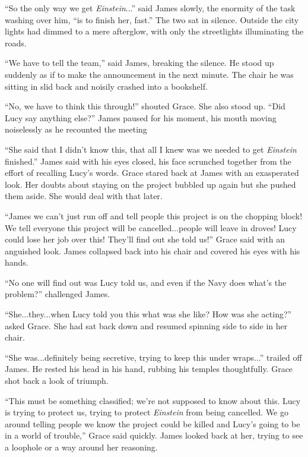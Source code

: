 \documentclass[openany, 12pt]{book} %
\begin{document}
``So the only way we get \textit{Einstein}...'' said James slowly, the enormity of the task washing over him, ``is to finish her, fast.'' The two sat in silence. Outside the city lights had dimmed to a mere afterglow, with only the streetlights illuminating the roads.

``We have to tell the team,'' said James, breaking the silence. He stood up suddenly as if to make the announcement in the next minute. The chair he was sitting in slid back and noisily crashed into a bookshelf.

``No, we have to think this through!'' shouted Grace. She also stood up. ``Did Lucy say anything else?'' James paused for his moment, his mouth moving noiselessly as he recounted the meeting

``She said that I didn't know this, that all I knew was we needed to get \textit{Einstein} finished.'' James said with his eyes closed, his face scrunched together from the effort of recalling Lucy's words. Grace stared back at James with an exasperated look. Her doubts about staying on the project bubbled up again but she pushed them aside. She would deal with that later.

``James we can't just run off and tell people this project is on the chopping block! We tell everyone this project will be cancelled...people will leave in droves! Lucy could lose her job over this! They'll find out she told us!'' Grace said with an anguished look. James collapsed back into his chair and covered his eyes with his hands. 

``No one will find out was Lucy told us, and even if the Navy does what's the problem?'' challenged James.

``She...they...when Lucy told you this what was she like? How was she acting?'' asked Grace. She had sat back down and resumed spinning side to side in her chair.

``She was...definitely being secretive, trying to keep this under wraps...'' trailed off James. He rested his head in his hand, rubbing his temples thoughtfully. Grace shot back a look of triumph.

``This must be something classified; we're not supposed to know about this. Lucy is trying to protect us, trying to protect \textit{Einstein} from being cancelled. We go around telling people we know the project could be killed and Lucy's going to be in a world of trouble,'' Grace said quickly. James looked back at her, trying to see a loophole or a way around her reasoning.
\end{document}
